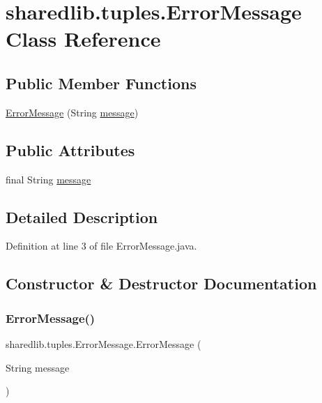 \hypertarget{classsharedlib_1_1tuples_1_1_error_message}{}\section{sharedlib.\+tuples.\+Error\+Message Class Reference}
\label{classsharedlib_1_1tuples_1_1_error_message}
\subsection*{Public Member Functions}
\begin{DoxyCompactItemize}
\item 
\hyperlink{classsharedlib_1_1tuples_1_1_error_message_a049f5130d57d7e5d34f9036c4a39cf98}{Error\+Message} (String \hyperlink{classsharedlib_1_1tuples_1_1_error_message_a26c9d43f1a3be733cfebcc55c735b6ed}{message})
\end{DoxyCompactItemize}
\subsection*{Public Attributes}
\begin{DoxyCompactItemize}
\item 
final String \hyperlink{classsharedlib_1_1tuples_1_1_error_message_a26c9d43f1a3be733cfebcc55c735b6ed}{message}
\end{DoxyCompactItemize}


\subsection{Detailed Description}


Definition at line 3 of file Error\+Message.\+java.



\subsection{Constructor \& Destructor Documentation}
\hypertarget{classsharedlib_1_1tuples_1_1_error_message_a049f5130d57d7e5d34f9036c4a39cf98}{}\label{classsharedlib_1_1tuples_1_1_error_message_a049f5130d57d7e5d34f9036c4a39cf98} 
\subsubsection{\texorpdfstring{Error\+Message()}{ErrorMessage()}}
{\footnotesize\ttfamily sharedlib.\+tuples.\+Error\+Message.\+Error\+Message (\begin{DoxyParamCaption}\item[{String}]{message }\end{DoxyParamCaption})}



